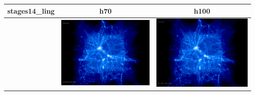 \begin{itemize}
\begin{table}[p]
\begin{tabular}{l|c|c}
\end{tabular}
\end{table}
\begin{table}[p]
\centering
\begin{tabular}{l|c|c}
stages14\_ling & h70 & h100 \\
\hline 
 & \includegraphics[scale=0.075]{r256/h100/stages14_ling/197.jpg} & \includegraphics[scale=0.075]{r256/h100/stages14_ling/197.jpg} \\

\end{tabular}
\end{table}
\end{itemize}
